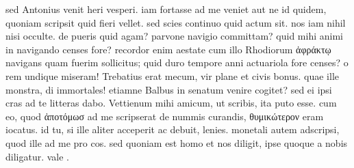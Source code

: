  sed Antonius venit heri vesperi. iam fortasse ad me veniet aut ne id quidem, quoniam scripsit quid fieri vellet. sed scies continuo quid actum sit. nos iam nihil nisi occulte. de pueris quid agam? parvone navigio committam? quid mihi animi in navigando censes fore? recordor enim aestate cum illo Rhodiorum ἀφράκτῳ navigans quam fuerim sollicitus; quid duro tempore anni actuariola fore censes? o rem undique miseram! Trebatius erat mecum, vir plane et civis bonus. quae ille monstra, di immortales! etiamne Balbus in senatum venire cogitet? sed ei ipsi cras ad te litteras dabo. Vettienum mihi amicum, ut scribis, ita puto esse. cum eo, quod ἀποτόμωσ ad me scripserat de nummis curandis, θυμικώτερον eram iocatus. id tu, si ille aliter acceperit ac debuit, lenies. monetali autem adscripsi, quod ille ad me pro cos. sed quoniam est homo et nos diligit, ipse quoque a nobis diligatur. vale .
